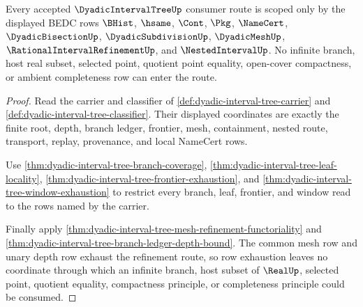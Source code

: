 \begin{theorem}
\label{thm:dyadic-interval-tree-scoped-kernel-route}
Every accepted $\DyadicIntervalTreeUp$ consumer route is scoped only by the displayed BEDC rows $\BHist$, $\hsame$, $\Cont$, $\Pkg$, $\NameCert$, $\DyadicBisectionUp$, $\DyadicSubdivisionUp$, $\DyadicMeshUp$, $\RationalIntervalRefinementUp$, and $\NestedIntervalUp$. No infinite branch, host real subset, selected point, quotient point equality, open-cover compactness, or ambient completeness row can enter the route.
\end{theorem}
\begin{proof}
Read the carrier and classifier of \autoref{def:dyadic-interval-tree-carrier} and \autoref{def:dyadic-interval-tree-classifier}. Their displayed coordinates are exactly the finite root, depth, branch ledger, frontier, mesh, containment, nested route, transport, replay, provenance, and local NameCert rows.

Use \autoref{thm:dyadic-interval-tree-branch-coverage}, \autoref{thm:dyadic-interval-tree-leaf-locality}, \autoref{thm:dyadic-interval-tree-frontier-exhaustion}, and \autoref{thm:dyadic-interval-tree-window-exhaustion} to restrict every branch, leaf, frontier, and window read to the rows named by the carrier.

Finally apply \autoref{thm:dyadic-interval-tree-mesh-refinement-functoriality} and \autoref{thm:dyadic-interval-tree-branch-ledger-depth-bound}. The common mesh row and unary depth row exhaust the refinement route, so row exhaustion leaves no coordinate through which an infinite branch, host subset of $\RealUp$, selected point, quotient equality, compactness principle, or completeness principle could be consumed.
\end{proof}

